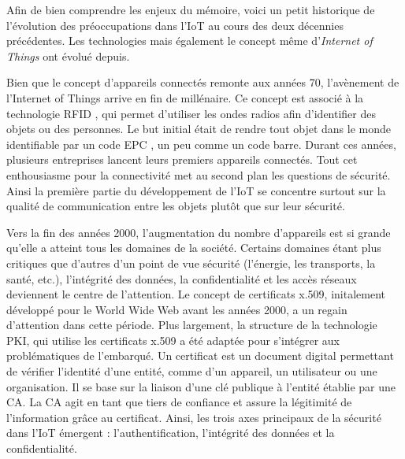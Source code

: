 \newpage

Afin de bien comprendre les enjeux du mémoire, voici un petit historique de l'évolution des préoccupations dans l'\ac{IoT} au cours des deux décennies précédentes. Les technologies mais également le concept même d'\textit{Internet of Things} ont évolué depuis.

\vspace{0.1cm}

Bien que le concept d'appareils connectés remonte aux années 70, l'avène\-ment de l'Internet of Things arrive en fin de millénaire. Ce concept est associé à la technologie \ac{RFID} \cite{RFID}, qui permet d'utiliser les ondes radios afin d'identifier des objets ou des personnes. Le but initial était de rendre tout objet dans le monde identifiable par un code \ac{EPC} \cite{EPC}, un peu comme un code barre. Durant ces années, plusieurs entreprises lancent leurs premiers appareils connectés. Tout cet enthousiasme pour la connectivité met au second plan les questions de sécurité. Ainsi la première partie du développement de l'\ac{IoT} se concentre surtout sur la qualité de communication entre les objets plutôt que sur leur sécurité.

\vspace{0.1cm}

Vers la fin des années 2000, l'augmentation du nombre d'appareils est si grande qu'elle a atteint tous les domaines de la société. Certains domaines étant plus critiques que d'autres d'un point de vue sécurité (l'énergie, les transports, la santé, etc.), l'intégrité des données, la confidentialité et les accès réseaux deviennent le centre de l'attention. 
Le concept de certificats x.509, initalement dévelop\-pé pour le World Wide Web avant les années 2000, a un regain d'attention dans cette période. Plus largement, la structure de la technologie \ac{PKI}, qui utilise les certificats x.509 \cite{PKI} a été adaptée pour s'intégrer aux problématiques de l'embarqué. Un certificat est un document digital permettant de vérifier l'identité d'une entité, comme d'un appareil, un utilisateur ou une organisation. Il se base sur la liaison d'une clé publique à l'entité établie par une \ac{CA}. La CA agit en tant que tiers de confiance et assure la légitimité de l'information grâce au certificat. Ainsi, les trois axes principaux de la sécurité dans l'\ac{IoT} émergent : l'authentification, l'intégrité des données et la confidentialité.

\vspace{0.1cm}


